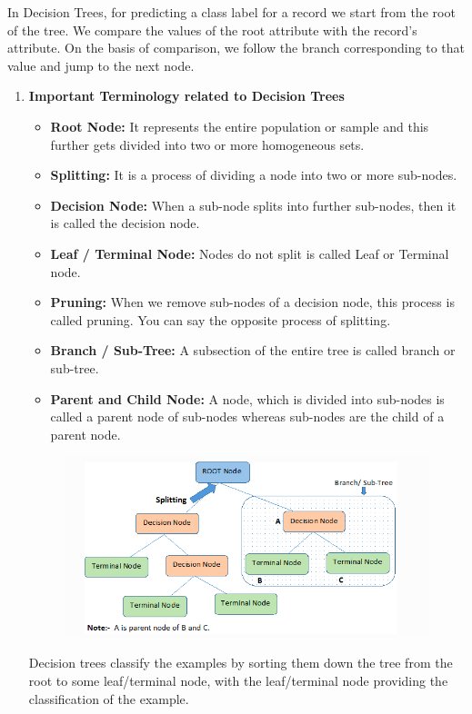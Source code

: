 In Decision Trees, for predicting a class label for a record we start from the root of the tree. We compare the values of the root attribute with the record’s attribute. On the basis of comparison, we follow the branch corresponding to that value and jump to the next node.
\vspace{-18pt}
\begin{enumerate}
\item \textbf{Important Terminology related to Decision Trees}
		\begin{itemize}
		\item \textbf{Root Node:} It represents the entire population or sample and this further gets divided         								  into two or more homogeneous sets.
		\item \textbf{Splitting:}  It is a process of dividing a node into two or more sub-nodes.
		\item \textbf{Decision Node:}  When a sub-node splits into further sub-nodes, then it is called the 										decision node.
		\item \textbf{Leaf / Terminal Node:} Nodes do not split is called Leaf or Terminal node.
		\item \textbf{Pruning:} When we remove sub-nodes of a decision node, this process is called pruning. You can say the opposite process of splitting.
		\item \textbf{Branch / Sub-Tree: } A subsection of the entire tree is called branch or sub-tree.
		\item \textbf{Parent and Child Node:}  A node, which is divided into sub-nodes is called a parent node of sub-nodes whereas sub-nodes are the child of a parent node.
		\end{itemize}

\begin{figure}[H]
	\centering
	\includegraphics[width=160mm]{images/decisiontreeoverview1.png}
	\label{figdecisionalgo1} %
\end{figure}
Decision trees classify the examples by sorting them down the tree from the root to some leaf/terminal node, with the leaf/terminal node providing the classification of the example.


\end{enumerate}
